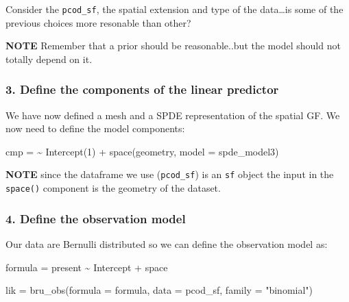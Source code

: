 \documentclass[
  letterpaper,
  DIV=11,
  numbers=noendperiod]{scrartcl}
\newenvironment{Shaded}{\begin{snugshade}}{\end{snugshade}}
\newcommand{\AttributeTok}[1]{\textcolor[rgb]{0.40,0.45,0.13}{#1}}
\newcommand{\DecValTok}[1]{\textcolor[rgb]{0.68,0.00,0.00}{#1}}
\newcommand{\ErrorTok}[1]{\textcolor[rgb]{0.68,0.00,0.00}{#1}}
\newcommand{\FunctionTok}[1]{\textcolor[rgb]{0.28,0.35,0.67}{#1}}
\newcommand{\NormalTok}[1]{\textcolor[rgb]{0.00,0.23,0.31}{#1}}
\newcommand{\OtherTok}[1]{\textcolor[rgb]{0.00,0.23,0.31}{#1}}
\newcommand{\SpecialCharTok}[1]{\textcolor[rgb]{0.37,0.37,0.37}{#1}}
\newcommand{\StringTok}[1]{\textcolor[rgb]{0.13,0.47,0.30}{#1}}
\begin{document}
\begin{tcolorbox}[enhanced jigsaw, title={Task}, bottomtitle=1mm, arc=.35mm, titlerule=0mm, opacityback=0, rightrule=.15mm, breakable, colback=white, colbacktitle=quarto-callout-warning-color!10!white, bottomrule=.15mm, coltitle=black, left=2mm, colframe=quarto-callout-warning-color-frame, toptitle=1mm, toprule=.15mm, opacitybacktitle=0.6, leftrule=.75mm]

Consider the \texttt{pcod\_sf}, the spatial extension and type of the
data\ldots is some of the previous choices more resonable than other?

\textbf{NOTE} Remember that a prior should be reasonable..but the model
should not totally depend on it.

\end{tcolorbox}

\subsubsection{3. Define the components of the linear
predictor}\label{define-the-components-of-the-linear-predictor}

We have now defined a mesh and a SPDE representation of the spatial GF.
We now need to define the model components:

\begin{Shaded}
\begin{Highlighting}[]
\NormalTok{cmp }\OtherTok{=} \ErrorTok{\textasciitilde{}} \FunctionTok{Intercept}\NormalTok{(}\DecValTok{1}\NormalTok{) }\SpecialCharTok{+} \FunctionTok{space}\NormalTok{(geometry, }\AttributeTok{model =}\NormalTok{ spde\_model3)}
\end{Highlighting}
\end{Shaded}

\textbf{NOTE} since the dataframe we use (\texttt{pcod\_sf}) is an
\texttt{sf} object the input in the \texttt{space()} component is the
geometry of the dataset.

\subsubsection{4. Define the observation
model}\label{define-the-observation-model}

Our data are Bernulli distributed so we can define the observation model
as:

\begin{Shaded}
\begin{Highlighting}[]
\NormalTok{formula }\OtherTok{=}\NormalTok{ present }\SpecialCharTok{\textasciitilde{}}\NormalTok{ Intercept  }\SpecialCharTok{+}\NormalTok{ space}

\NormalTok{lik }\OtherTok{=} \FunctionTok{bru\_obs}\NormalTok{(}\AttributeTok{formula =}\NormalTok{ formula, }
              \AttributeTok{data =}\NormalTok{ pcod\_sf, }
              \AttributeTok{family =} \StringTok{"binomial"}\NormalTok{)}
\end{Highlighting}
\end{Shaded}
\end{document}
